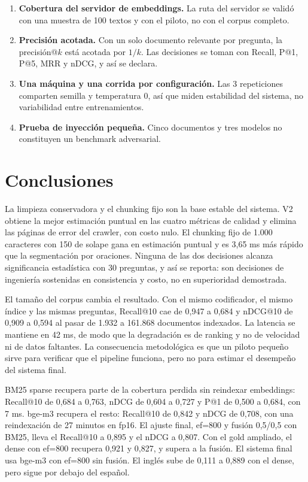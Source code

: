 \documentclass[11pt]{tg_usta}
\begin{document}
\begin{enumerate}
\item \textbf{Cobertura del servidor de embeddings.} La ruta del servidor se validó con una muestra de 100 textos y con el piloto, no con el corpus completo.
\item \textbf{Precisión acotada.} Con un solo documento relevante por pregunta, la precisión@$k$ está acotada por $1/k$. Las decisiones se toman con Recall, P@1, P@5, MRR y nDCG, y así se declara.
\item \textbf{Una máquina y una corrida por configuración.} Las 3 repeticiones comparten semilla y temperatura 0, así que miden estabilidad del sistema, no variabilidad entre entrenamientos.
\item \textbf{Prueba de inyección pequeña.} Cinco documentos y tres modelos no constituyen un benchmark adversarial.
\end{enumerate}

\section{Conclusiones}

La limpieza conservadora y el chunking fijo son la base estable del sistema. V2 obtiene la mejor estimación puntual en las cuatro métricas de calidad y elimina las páginas de error del crawler, con costo nulo. El chunking fijo de 1.000 caracteres con 150 de solape gana en estimación puntual y es 3,65 ms más rápido que la segmentación por oraciones. Ninguna de las dos decisiones alcanza significancia estadística con 30 preguntas, y así se reporta: son decisiones de ingeniería sostenidas en consistencia y costo, no en superioridad demostrada.

El tamaño del corpus cambia el resultado. Con el mismo codificador, el mismo índice y las mismas preguntas, Recall@10 cae de 0,947 a 0,684 y nDCG@10 de 0,909 a 0,594 al pasar de 1.932 a 161.868 documentos indexados. La latencia se mantiene en 42 ms, de modo que la degradación es de ranking y no de velocidad ni de datos faltantes. La consecuencia metodológica es que un piloto pequeño sirve para verificar que el pipeline funciona, pero no para estimar el desempeño del sistema final.

BM25 sparse recupera parte de la cobertura perdida sin reindexar embeddings: Recall@10 de 0,684 a 0,763, nDCG de 0,604 a 0,727 y P@1 de 0,500 a 0,684, con 7 ms. bge-m3 recupera el resto: Recall@10 de 0,842 y nDCG de 0,708, con una reindexación de 27 minutos en fp16. El ajuste final, ef=800 y fusión 0,5/0,5 con BM25, lleva el Recall@10 a 0,895 y el nDCG a 0,807. Con el gold ampliado, el dense con ef=800 recupera 0,921 y 0,827, y supera a la fusión. El sistema final usa bge-m3 con ef=800 sin fusión. El inglés sube de 0,111 a 0,889 con el dense, pero sigue por debajo del español.
\end{document}
